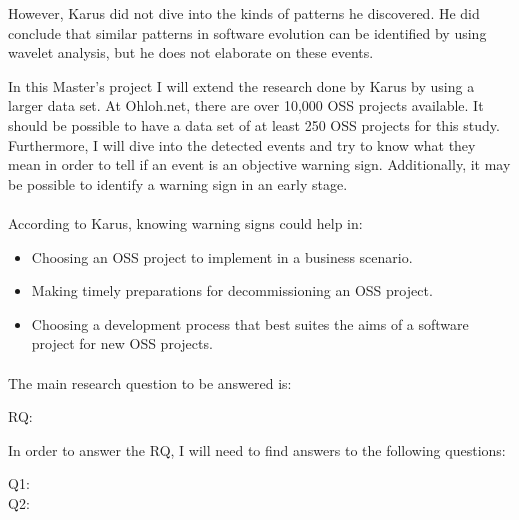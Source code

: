However, Karus did not dive into the kinds of patterns he discovered. He did
conclude that similar patterns in software evolution can be identified by using
wavelet analysis, but he does not elaborate on these events.

In this Master's project I will extend the research done by Karus by using a
larger data set. At Ohloh.net, there are over 10,000 OSS projects available. It
should be possible to have a data set of at least 250 OSS projects for this
study.
Furthermore, I will dive into the detected events and try to know what they mean
in order to tell if an event is an objective warning sign. Additionally, it may
be possible to identify a warning sign in an early stage.

\paragraph{}
According to Karus, knowing warning signs could help in:
\begin{itemize}
	\item Choosing an OSS project to implement in a business scenario.
	\item Making timely preparations for decommissioning an OSS project.
	\item Choosing a development process that best suites the aims of a software
	project for new OSS projects.
\end{itemize}

\paragraph{}
The main research question to be answered is:
\begin{description}
	\item[RQ:] \emph{\researchQuestion} \cite{karus2013}
\end{description}

In order to answer the RQ, I will need to find answers to the following
questions:
\begin{description}
	\item[Q1:] \subQuestionOne
	\item[Q2:] \subQuestionTwo
\end{description}
